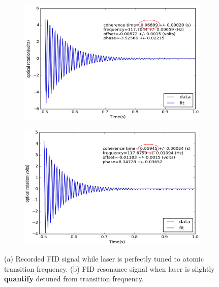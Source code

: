 \begin{itemize}
\begin{figure}
  \centering
  \begin{subfigure}[b]{0.45\textwidth}
    \centering
    \includegraphics[width=\textwidth]{figures/perfect_tuning}
    \caption{}
    \label{fig:good tuning}
  \end{subfigure}
  \hfill
  \begin{subfigure}[b]{0.45\textwidth}
    \centering
    \includegraphics[width=\textwidth]{figures/bad_tuning}
    \caption{}
    \label{fig:bad tuning}
  \end{subfigure}
  \caption{(a) Recorded FID signal while laser is perfectly tuned to
    atomic transition frequency. (b) FID resonance signal when laser
    is slightly {\bf quantify} detuned from transition frequency.}
  \label{fig:effect of tuning}
\end{figure}
	

\end{itemize}
